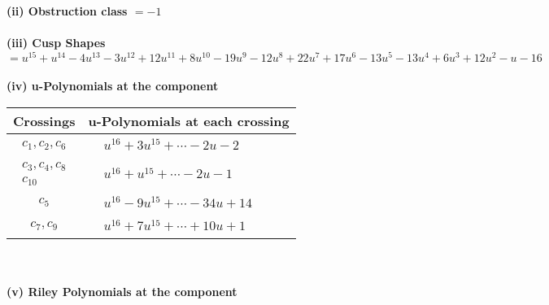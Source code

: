 \documentclass[1p]{elsarticle_modified}
\theoremstyle{definition}
\begin{document}
\flushleft \textbf{(ii) Obstruction class $= -1$}\\~\\
\flushleft \textbf{(iii) Cusp Shapes $= u^{15}+u^{14}-4 u^{13}-3 u^{12}+12 u^{11}+8 u^{10}-19 u^9-12 u^8+22 u^7+17 u^6-13 u^5-13 u^4+6 u^3+12 u^2- u-16$}\\~\\
\newpage\renewcommand{\arraystretch}{1}
\flushleft \textbf{(iv) u-Polynomials at the component}\newline \\
\begin{tabular}{m{50pt}|m{274pt}}
Crossings & \hspace{64pt}u-Polynomials at each crossing \\
\hline $$\begin{aligned}c_{1},c_{2},c_{6}\end{aligned}$$&$\begin{aligned}
&u^{16}+3 u^{15}+\cdots-2 u-2
\end{aligned}$\\
\hline $$\begin{aligned}c_{3},c_{4},c_{8}\\c_{10}\end{aligned}$$&$\begin{aligned}
&u^{16}+u^{15}+\cdots-2 u-1
\end{aligned}$\\
\hline $$\begin{aligned}c_{5}\end{aligned}$$&$\begin{aligned}
&u^{16}-9 u^{15}+\cdots-34 u+14
\end{aligned}$\\
\hline $$\begin{aligned}c_{7},c_{9}\end{aligned}$$&$\begin{aligned}
&u^{16}+7 u^{15}+\cdots+10 u+1
\end{aligned}$\\
\hline
\end{tabular}\\~\\
\newpage\renewcommand{\arraystretch}{1}
\flushleft \textbf{(v) Riley Polynomials at the component}\newline \\
\end{document}
